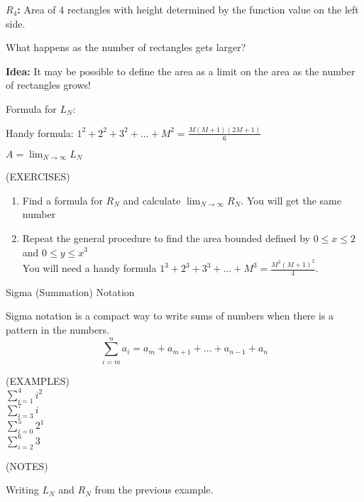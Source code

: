 \documentclass[11pt]{article}
\begin{document}
\vspace{2.5in}

{\bf $R_4$:} Area of 4 rectangles with height determined by the function value on the left side.       

\vspace{1.5in}

What happens as the number of rectangles gets larger?

\vspace{1.5in}

{\bf Idea:} It may be possible to define the area as a limit on the area as the number of rectangles grows!

\vspace{.5in}
Formula for $L_N$:

\pagebreak


Handy formula:  $1^2 + 2^2 + 3^2 + ... + M^2 = \frac{M(M+1)(2M+1)}{6}$

\vspace{3.5in}

$ A = \lim_{N\to\infty}L_N$ 

\vspace{2.5in}


(EXERCISES)\\
\begin{enumerate}
\item{Find a formula for $R_N$ and calculate $\lim_{N\to\infty}R_N$.  You will get the same number}
\item{Repeat the general procedure to find the area bounded defined by $0\leq x \leq 2$ and $0 \leq y \leq x^3$\\
You will need a handy formula $1^3 + 2^3 + 3^3 + ... + M^3 = \frac{M^2(M+1)^2}{4}$.}
\end{enumerate}

\pagebreak


\begin{center}
\Large
\rm{Sigma (Summation) Notation}
\\
\end{center}
Sigma notation is a compact way to write sums of numbers when there is a pattern in the numbers.
\begin{displaymath}
\sum_{i=m}^na_i = a_m + a_{m+1} + ... + a_{n-1} + a_n
  \end{displaymath}
\vspace{0.2in}

(EXAMPLES)\\
$\sum_{i=1}^4 i^2$ \\

  \vspace{0.2in}
  $\sum_{i=3}^7 i$\\
  
  \vspace{0.2in}
  $\sum_{i=0}^5 2^1$\\
  
  \vspace{0.2in}
$\sum_{i=2}^6 3 $ \\

    \vspace{0.2in}

    (NOTES)\\

    \vspace{3in}


    Writing $L_N$ and $R_N$ from the previous example.
\end{document}
